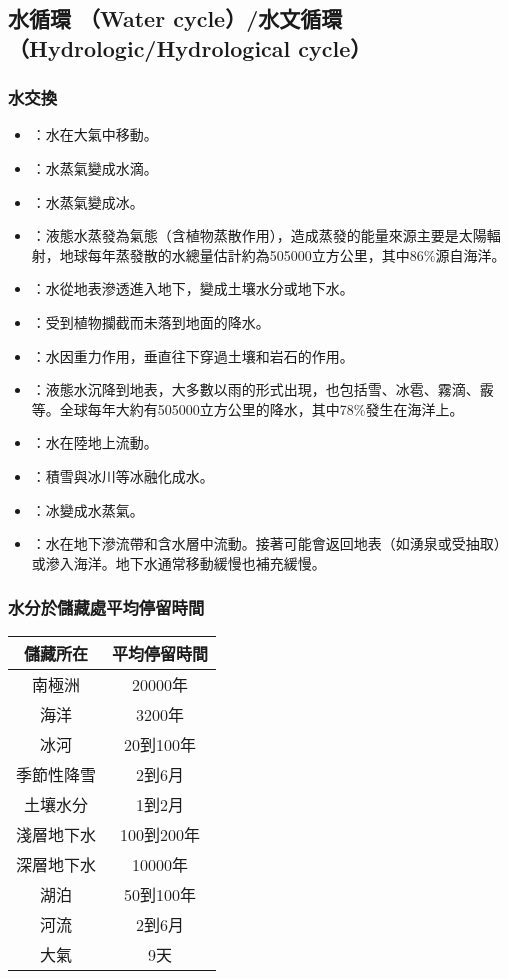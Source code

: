 \documentclass[a4paper,12pt]{report}
\begin{document}
\begin{itemize}
\subsection{水循環 （Water cycle）/水文循環（Hydrologic/Hydrological cycle）}
\subsubsection{水交換}
\begin{itemize}
\item {}：水在大氣中移動。
\item {}：水蒸氣變成水滴。
\item {}：水蒸氣變成冰。
\item {}：液態水蒸發為氣態（含植物蒸散作用），造成蒸發的能量來源主要是太陽輻射，地球每年蒸發散的水總量估計約為505000立方公里，其中86\%源自海洋。
\item {}：水從地表滲透進入地下，變成土壤水分或地下水。
\item {}：受到植物攔截而未落到地面的降水。
\item {}：水因重力作用，垂直往下穿過土壤和岩石的作用。
\item {}：液態水沉降到地表，大多數以雨的形式出現，也包括雪、冰雹、霧滴、霰等。全球每年大約有505000立方公里的降水，其中78\%發生在海洋上。
\item {}：水在陸地上流動。
\item {}：積雪與冰川等冰融化成水。
\item {}：冰變成水蒸氣。
\item {}：水在地下滲流帶和含水層中流動。接著可能會返回地表（如湧泉或受抽取）或滲入海洋。地下水通常移動緩慢也補充緩慢。
\end{itemize}
\subsubsection{水分於儲藏處平均停留時間}
\begin{longtable}[c]{|c|c|}
\hline
儲藏所在 & 平均停留時間\\\hline\endhead
南極洲 & 20000年\\\hline
海洋 & 3200年\\\hline
冰河 & 20到100年\\\hline
季節性降雪 & 2到6月\\\hline
土壤水分 & 1到2月\\\hline
淺層地下水 & 100到200年\\\hline
深層地下水 & 10000年\\\hline
湖泊 & 50到100年\\\hline
河流 & 2到6月\\\hline
大氣 & 9天\\\hline
\end{longtable}\FB

\end{itemize}
\end{document}
